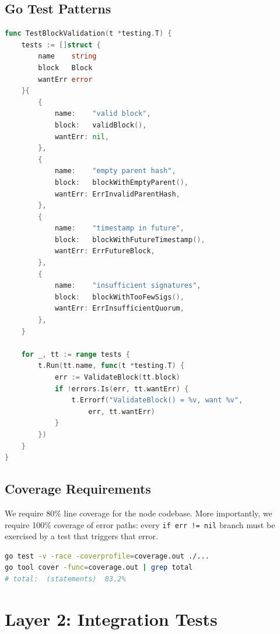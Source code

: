 \documentclass[11pt,a4paper]{article}
\begin{document}
\subsection{Go Test Patterns}

\begin{lstlisting}[language=Go,caption={Table-driven unit test}]
func TestBlockValidation(t *testing.T) {
    tests := []struct {
        name    string
        block   Block
        wantErr error
    }{
        {
            name:    "valid block",
            block:   validBlock(),
            wantErr: nil,
        },
        {
            name:    "empty parent hash",
            block:   blockWithEmptyParent(),
            wantErr: ErrInvalidParentHash,
        },
        {
            name:    "timestamp in future",
            block:   blockWithFutureTimestamp(),
            wantErr: ErrFutureBlock,
        },
        {
            name:    "insufficient signatures",
            block:   blockWithTooFewSigs(),
            wantErr: ErrInsufficientQuorum,
        },
    }

    for _, tt := range tests {
        t.Run(tt.name, func(t *testing.T) {
            err := ValidateBlock(tt.block)
            if !errors.Is(err, tt.wantErr) {
                t.Errorf("ValidateBlock() = %v, want %v",
                    err, tt.wantErr)
            }
        })
    }
}
\end{lstlisting}

\subsection{Coverage Requirements}

We require 80\% line coverage for the node codebase. More importantly, we require 100\%
coverage of error paths: every \texttt{if err != nil} branch must be exercised by a test
that triggers that error.

\begin{lstlisting}[language=bash,caption={Running Go tests with coverage}]
go test -v -race -coverprofile=coverage.out ./...
go tool cover -func=coverage.out | grep total
# total:  (statements)  83.2%
\end{lstlisting}

\section{Layer 2: Integration Tests}
\end{document}
